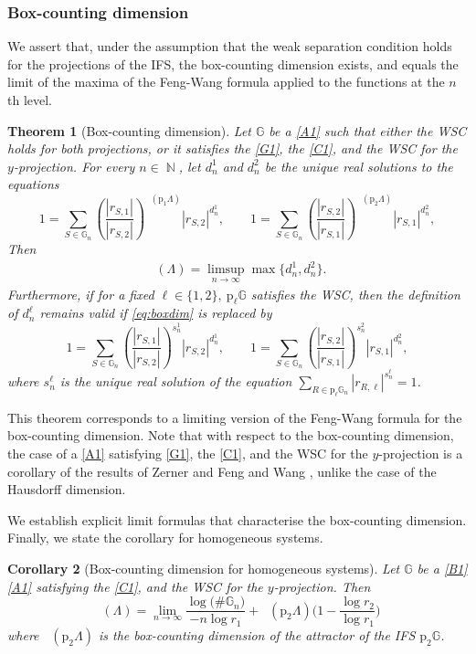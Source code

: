 \documentclass[a4paper, 11pt]{article}
\DeclareMathOperator{\N}{\mathbb{N}}
\DeclareMathOperator{\dB}{\dim_{\mathrm{B}}}
\numberwithin{equation}{section}
\theoremstyle{plain}
\newtheorem{theorem}{Theorem}[section]
\newtheorem{corollary}[theorem]{Corollary}
\theoremstyle{remark}
\theoremstyle{definition}
\begin{document}
\subsubsection{Box-counting dimension}
We assert that, under the assumption that the weak separation condition holds for the projections of the IFS, the box-counting dimension exists, and equals the limit of the maxima of the Feng-Wang formula applied to the functions at the $n$th level.


\begin{theorem}[Box-counting dimension] \label{tb}
Let $\mathbb{G}$ be a \ref{A1} such that either the WSC holds for both projections, or it satisfies the \ref{G1}, the \ref{C1}, and the WSC for the $y$-projection. For every $n\in\N$, let $d_n^1$ and $d_n^2$ be the unique real solutions to the equations
\begin{equation}\label{eq:boxdim}
1= \sum_{S\in \mathbb{G}_n} \left( \frac{|r_{S,1}|}{|r_{S,2}|} \right)^{\dB(\mathrm{p}_1\Lambda)} |r_{S,2}|^{d_n^1}, \qquad 1= \sum_{S \in \mathbb{G}_n} \left( \frac{|r_{S,2}|}{|r_{S,1}|} \right)^{\dB(\mathrm{p}_2\Lambda)} |r_{S,1}|^{d_n^2},
\end{equation}
Then
\begin{align*}
\dB(\Lambda) = \limsup_{n \to \infty} \max\{d_n^1,d_n^2\}.
\end{align*}
Furthermore, if for a fixed $\ell \in \{1,2\}, \ \mathrm{p}_\ell\mathbb{G}$ satisfies the WSC, then the definition of $d_n^\ell$ remains valid if \eqref{eq:boxdim} is replaced by 
\[
1= \sum_{S\in \mathbb{G}_n} \left( \frac{|r_{S,1}|}{|r_{S,2}|} \right)^{s_n^1} |r_{S,2}|^{d_n^1}, \qquad 1= \sum_{S \in \mathbb{G}_n} \left( \frac{|r_{S,2}|}{|r_{S,1}|} \right)^{s_n^2} |r_{S,1}|^{d_n^2},
\]
where $s_n^\ell$ is the unique real solution of the equation $\sum_{R\in\mathrm{p}_\ell\mathbb{G}_n}|r_{R,\ell}|^{s_n^\ell}=1$.
\end{theorem}

This theorem corresponds to a limiting version of the Feng-Wang formula \cite{MR2128947} for the box-counting dimension. Note that with respect to the box-counting dimension, the case of a \ref{A1} satisfying \ref{G1}, the \ref{C1}, and the WSC for the $y$-projection is a corollary of the results of Zerner \cite{MR1343732} and Feng and Wang \cite{MR2128947}, unlike the case of the Hausdorff dimension.

We establish explicit limit formulas that characterise the box-counting dimension. Finally, we state the corollary for homogeneous systems.
\begin{corollary}[Box-counting dimension for homogeneous systems] \label{tbh}
Let $\mathbb{G}$ be a \ref{B1} \ref{A1} satisfying the \ref{C1}, and the WSC for the $y$-projection. Then
\begin{equation*}
	\dB(\Lambda) = \lim_{n \to \infty}\frac{\log \big(\#\mathbb{G}_n\big)}{-n\log r_1} + \dB(\mathrm{p}_2\Lambda)\Big(1 - \frac{\log r_2}{\log r_1}\Big)
\end{equation*}
where $\dB(\mathrm{p}_2\Lambda)$ is the box-counting dimension of the attractor of the IFS $\mathrm{p}_2\mathbb{G}$.
\end{corollary}
\end{document}
